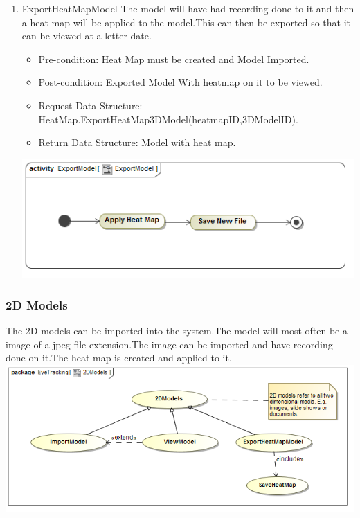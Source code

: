 \begin{enumerate}
		\item{ExportHeatMapModel}
		The model will have had recording done to it and then a heat map will be applied to the model.This can then be exported so that it can be viewed at a letter date. 
		\begin{itemize}
			\item Pre-condition: Heat Map must be created and Model Imported.
			\item Post-condition: Exported Model With heatmap on it to be viewed.
			\item Request Data Structure: HeatMap.ExportHeatMap3DModel(heatmapID,3DModelID).
			\item Return Data Structure: Model with heat map.
		\end{itemize}
		
		\includegraphics[scale=0.5]{Diagrams/Activity_Diagram__ExportModel__ExportModel.png}
	\end{enumerate}

	\subsubsection{2D Models}
	The 2D models can be imported into the system.The model will most often be a image of a jpeg file extension.The image can be imported and have recording done on it.The heat map is created and applied to it.
	\newline
	\includegraphics[scale=0.5]{Diagrams/Use_Case_Diagram__2DModels.png}
		
